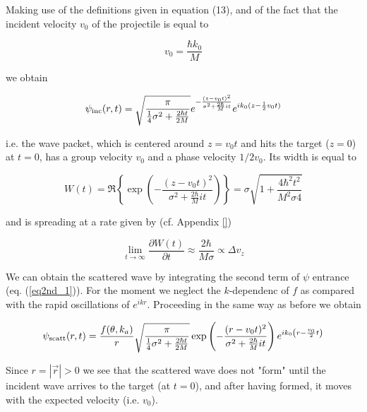 \noindent Making use of the definitions given in equation (13), and of the fact that the incident velocity $v_0$ of the projectile is equal to

\begin{equation}
v_0 = \frac{\hbar k_0}{M}
\end{equation}

\noindent we obtain

\begin{equation}
\psi_{\rm inc}(r,t) = \sqrt{\frac{\pi}{\frac{1}{4} \sigma^2 + \frac{2 \hbar t}{2M}}} e^{- \frac{(z-v_0 t)^2}{\sigma^2 + \frac{2 \hbar}{M} i t}} e^{ik_0 (z - \frac{1}{2} v_0 t)}
\end{equation}

\noindent i.e. the wave packet, which is centered around $z=v_0 t$ and hits the target ($z=0$) at $t=0$, has a group velocity $v_0$ and a phase velocity $1/2 v_0$. Its width is equal to

\begin{equation}
W(t) = \Re \left\{ \exp \left(- \frac{(z-v_0 t)^2}{\sigma^2 + \frac{2 \hbar}{M} i t}\right) \right\} = \sigma \sqrt{1+ \frac{4 \hbar^2 t^2}{M^2 \sigma 4}}
\end{equation}

\noindent and is spreading at a rate given by (cf. Appendix \ref{})

\begin{equation}
\lim_{t \rightarrow \infty} \frac{\partial W(t)}{\partial t} \approx \frac{2 \hbar}{M \sigma} \propto \Delta v_z
\end{equation}

 We can obtain the scattered wave by integrating the second term of $\psi$ entrance (eq. (\ref{eq2nd_1})). For the moment we neglect the $k$-dependenc of $f$ as compared with the rapid oscillations of $e^{ikr}$. Proceeding in the same way as before we obtain

\begin{equation}
\psi_{\rm scatt}(r,t) = \frac{f(\theta, k_a)}{r} \sqrt{\frac{\pi}{\frac{1}{4} \sigma^2 + \frac{2 \hbar t}{2M}}} \exp\left(- \frac{(r-v_0 t)^2}{\sigma^2 + \frac{2 \hbar}{M} i t}\right) e^{i k_0 \left( r- \frac{v_0}{2} t \right)}
\end{equation}

\noindent Since $r = |\vec{r}| > 0$ we see that the scattered wave does not "form" until the incident wave arrives to the target (at $t=0$), and after having formed, it moves with the expected velocity (i.e. $v_0$).

